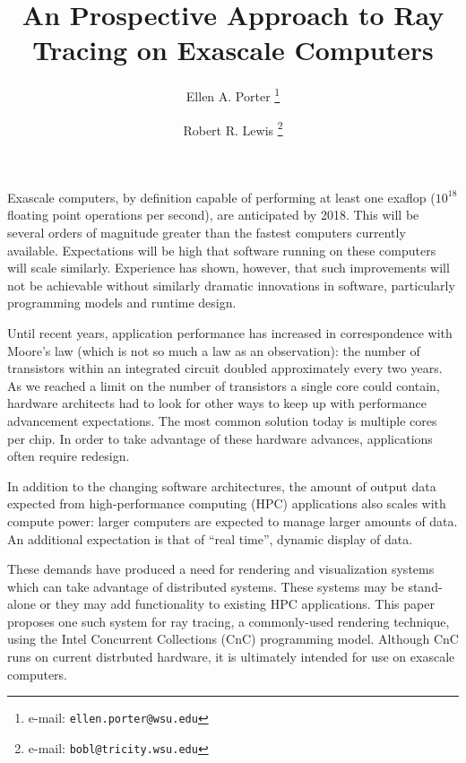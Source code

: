 \documentclass{vgtc}                          %
\title{An Prospective Approach to Ray Tracing on Exascale Computers}
\author{
  Ellen A. Porter
  \thanks{e-mail: \texttt{ellen.porter@wsu.edu}} %
  \and
  Robert R. Lewis
  \thanks{e-mail: \texttt{bobl@tricity.wsu.edu}}}
\affiliation{
  \scriptsize Washington State University, Tri-Cities \\
  Program in Engineering and Computer Science}
\begin{document}



\maketitle


Exascale computers, by definition capable of performing at least one
exaflop ($10^{18}$ floating point operations per second), are
anticipated by 2018.
This will be several orders of magnitude greater than the fastest computers
currently available. Expectations will be high that software running on these computers will scale similarly.
Experience has shown, however, that such improvements will not be
achievable without similarly dramatic innovations in software,
particularly programming models and runtime design.

Until recent years, application performance has increased in
correspondence with Moore's law (which is not so much a law as an
observation): the number of transistors within an integrated circuit
doubled approximately every two years. As we reached a limit on the
number of transistors a single core could contain, hardware architects
had to look for other ways to keep up with performance advancement
expectations. The most common solution today is multiple cores per
chip. In order to take advantage of these hardware advances,
applications often require redesign.

In addition to the changing software architectures, the amount of
output data expected from high-performance computing (HPC)
applications also scales with compute power: larger computers are
expected to manage larger amounts of data. An additional expectation
is that of ``real time'', dynamic display of data.

These demands have produced a need for rendering and visualization
systems which can take advantage of distributed systems. These systems
may be stand-alone or they may add functionality to existing HPC
applications. This paper proposes one such system for ray tracing, a
commonly-used rendering technique, using the Intel Concurrent
Collections (CnC) programming model. Although CnC runs on current
distrbuted hardware, it is ultimately intended for use on exascale
computers.
\end{document}
